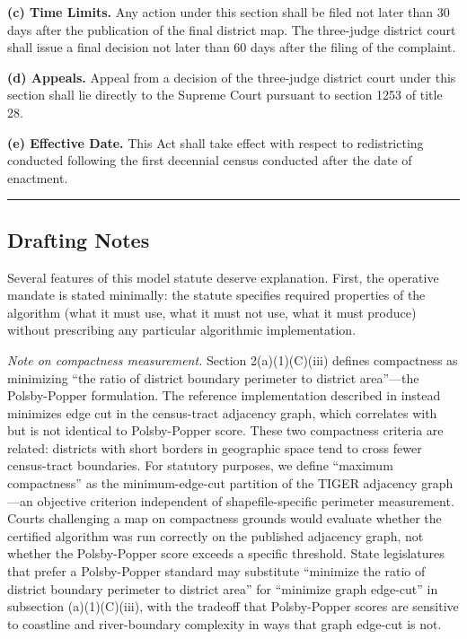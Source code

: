\textbf{(c) Time Limits.} Any action under this section shall be filed not later than 30 days after the publication of the final district map. The three-judge district court shall issue a final decision not later than 60 days after the filing of the complaint.

\textbf{(d) Appeals.} Appeal from a decision of the three-judge district court under this section shall lie directly to the Supreme Court pursuant to section 1253 of title 28.

\textbf{(e) Effective Date.} This Act shall take effect with respect to redistricting conducted following the first decennial census conducted after the date of enactment.

\noindent\rule{\linewidth}{0.4pt}

\bigskip

\subsection{Drafting Notes}

Several features of this model statute deserve explanation. First, the operative mandate is stated minimally: the statute specifies required properties of the algorithm (what it must use, what it must not use, what it must produce) without prescribing any particular algorithmic implementation.

\textit{Note on compactness measurement.} Section 2(a)(1)(C)(iii) defines compactness as minimizing ``the ratio of district boundary perimeter to district area''---the Polsby-Popper formulation. The reference implementation described in \citet{dellaLibera2026recursive} instead minimizes edge cut in the census-tract adjacency graph, which correlates with but is not identical to Polsby-Popper score. These two compactness criteria are related: districts with short borders in geographic space tend to cross fewer census-tract boundaries. For statutory purposes, we define ``maximum compactness'' as the minimum-edge-cut partition of the TIGER adjacency graph---an objective criterion independent of shapefile-specific perimeter measurement. Courts challenging a map on compactness grounds would evaluate whether the certified algorithm was run correctly on the published adjacency graph, not whether the Polsby-Popper score exceeds a specific threshold. State legislatures that prefer a Polsby-Popper standard may substitute ``minimize the ratio of district boundary perimeter to district area'' for ``minimize graph edge-cut'' in subsection (a)(1)(C)(iii), with the tradeoff that Polsby-Popper scores are sensitive to coastline and river-boundary complexity in ways that graph edge-cut is not.

